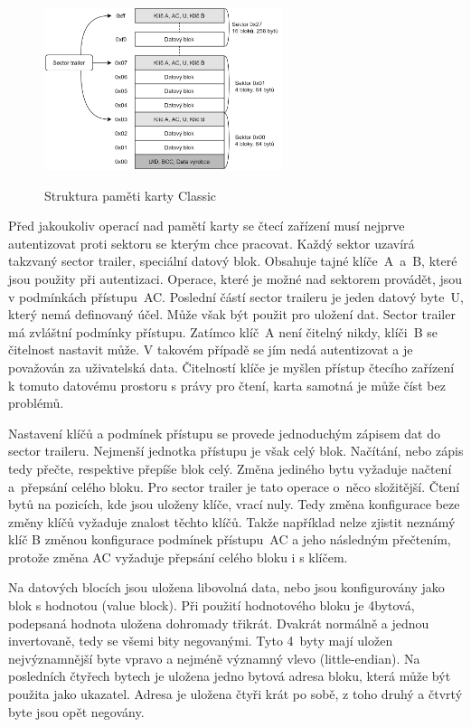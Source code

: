 \begin{figure}[ht]\centering
  \centering
  \hspace*{-0.07\linewidth}
  \includegraphics[width=0.6\linewidth,height=180px]{obrazky-figures/MemoryStructure.png}\\[1pt]  
  \caption{Struktura paměti karty Classic\cite{PracticalAttackOnMIFARE}}    
  \label{obrazekStrukturaPametiKarty}
\end{figure}

\par
Před jakoukoliv operací nad pamětí karty se čtecí zařízení musí nejprve autentizovat proti sektoru se kterým chce pracovat. Každý sektor uzavírá takzvaný sector trailer, speciální datový blok. Obsahuje tajné klíče~A~a~B, které jsou použity při autentizaci. Operace, které je možné nad sektorem provádět, jsou v podmínkách přístupu~AC. Poslední částí sector traileru je jeden datový byte~U, který nemá definovaný účel. Může však být použit pro uložení dat. Sector trailer má zvláštní  podmínky přístupu. Zatímco klíč~A není čitelný nikdy, klíči~B se čitelnost nastavit může. V takovém případě se jím nedá autentizovat a je považován za uživatelská data. Čitelností klíče je myšlen přístup čtecího zařízení k tomuto datovému prostoru s právy pro čtení, karta samotná je může číst bez problémů\cite{PracticalAttackOnMIFARE}. \par
Nastavení klíčů a podmínek přístupu se provede jednoduchým zápisem dat do sector traileru. Nejmenší jednotka přístupu je však celý blok. Načítání, nebo zápis tedy přečte, respektive přepíše blok celý. Změna jediného bytu vyžaduje načtení a~přepsání celého bloku. Pro sector trailer je tato operace o~něco složitější. Čtení bytů na pozicích, kde jsou uloženy klíče, vrací nuly. Tedy změna konfigurace beze změny klíčů vyžaduje znalost těchto klíčů. Takže například nelze zjistit neznámý klíč B změnou konfigurace podmínek přístupu~AC a jeho následným přečtením, protože změna AC vyžaduje přepsání celého bloku i s klíčem\cite{makingTheBestOf}.
\par
Na datových blocích jsou uložena libovolná data, nebo jsou konfigurovány jako blok s hodnotou (value block). Při použití hodnotového bloku je 4bytová, podepsaná hodnota uložena dohromady třikrát. Dvakrát normálně a jednou invertovaně, tedy se všemi bity negovanými. Tyto 4~byty mají uložen nejvýznamnější byte vpravo a nejméně významný vlevo ({little-endian}). Na posledních čtyřech bytech je uložena jedno bytová adresa bloku, která může být použita jako ukazatel. Adresa je uložena čtyři krát po sobě, z toho druhý a čtvrtý byte jsou opět negovány\cite{PracticalAttackOnMIFARE}.

